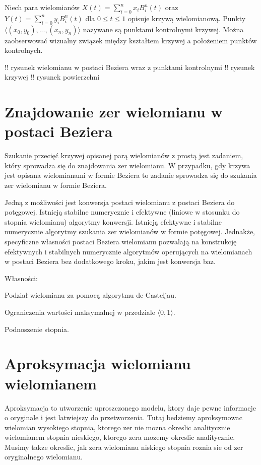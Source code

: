 \documentclass[11pt,a4paper,oneside]{report}
\begin{document}
Niech para wielomianów $X(t) = \sum^n_{i=0}x_i B^n_i(t)$ oraz $Y(t) = \sum^n_{i=0}y_i B^n_i(t)$ dla $0\leq t \leq 1$ opisuje krzywą wielomianową. Punkty $\langle (x_0,y_0), ..., (x_n, y_n) \rangle$ nazywane są punktami kontrolnymi krzywej. Można zaobserwować wizualny związek między kształtem krzywej a położeniem punktów kontrolnych.

!! rysunek wielomianu w postaci Beziera wraz z punktami kontrolnymi
!! rysunek krzywej
!! rysunek powierzchni

\section{Znajdowanie zer wielomianu w postaci Beziera}

Szukanie przecięć krzywej opisanej parą wielomianów z prostą jest zadaniem, który sprowadza się do znajdowania zer wielomianu. W przypadku, gdy krzywa jest opisana wielomianami w formie Beziera to zadanie sprowadza się do szukania zer wielomianu w formie Beziera.

Jedną z możliwości jest konwersja postaci wielomianu z postaci Beziera do potęgowej. Istnieją stabilne numerycznie i efektywne (liniowe w stosunku do stopnia wielomianu) algorytmy konwersji. Istnieją efektywne i stabilne numerycznie algorytmy szukania zer wielomianów w formie potęgowej. Jednakże, specyficzne własności postaci Beziera wielomianu pozwalają na konstrukcję efektywnych i stabilnych numerycznie algorytmów operujących na wielomianach w postaci Beziera bez dodatkowego kroku, jakim jest konwersja baz.

Własności:

Podział wielomianu za pomocą algorytmu de Casteljau.

Ograniczenia wartości maksymalnej w przedziale $\langle 0, 1 \rangle$.

Podnoszenie stopnia.

\section{Aproksymacja wielomianu wielomianem}

Aproksymacja to utworzenie uproszczonego modelu, ktory daje pewne informacje o oryginale i jest latwiejszy do przetworzenia. Tutaj bedziemy aproksymowac wielomian wysokiego stopnia, ktorego zer nie mozna okreslic analitycznie wielomianem stopnia nieskiego, ktorego zera mozemy okreslic analitycznie. Musimy takze okreslic, jak zera wielomianu niskiego stopnia roznia sie od zer oryginalnego wielomianu.
\end{document}
